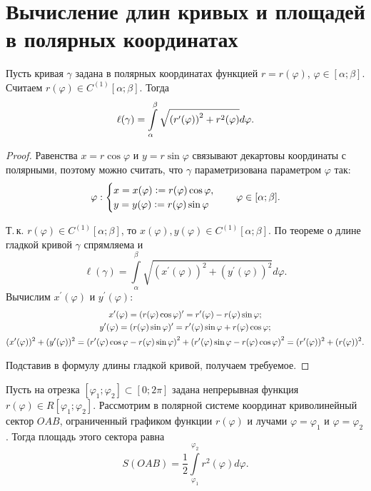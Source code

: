 \section{Вычисление длин кривых и площадей в полярных координатах}

\begin{theorem}
    Пусть кривая $\gamma$ задана в полярных координатах функцией $r = r(\varphi)$, $\varphi \in [\alpha; \beta]$. Считаем $r(\varphi) \in C^{(1)}[\alpha; \beta]$. Тогда
    \[
        \ell(\gamma) = \int\limits_\alpha^\beta\sqrt{\left(r^\prime(\varphi)\right)^2 + r^2(\varphi)}d\varphi.
    \]
\end{theorem}

\begin{proof}
    Равенства $x = r\cos\varphi$ и $y = r\sin\varphi$ связывают декартовы координаты с полярными, поэтому можно считать, что $\gamma$ параметризована параметром $\varphi$ так:
    \[
        \varphi:
        \begin{cases}
            x = x(\varphi) \vcentcolon = r(\varphi)\cos\varphi,\\
            y = y(\varphi) \vcentcolon = r(\varphi)\sin\varphi
        \end{cases}\quad \varphi \in [\alpha; \beta].
    \]

    Т.\,к. $r(\varphi) \in C^{(1)}[\alpha; \beta]$, то $x(\varphi), y(\varphi) \in C^{(1)}[\alpha; \beta]$. По теореме о длине гладкой кривой $\gamma$ спрямляема и
    \[
        \ell(\gamma) = \int\limits_\alpha^\beta\sqrt{(x^\prime(\varphi))^2 + (y^\prime(\varphi))^2}d\varphi.
    \]
    Вычислим $x^\prime(\varphi)$ и $y^\prime(\varphi)$:
    \begin{gather*}
        x^\prime(\varphi) = (r(\varphi)\cos\varphi)^\prime = r^\prime(\varphi) - r(\varphi)\sin\varphi;\\
        y^\prime(\varphi) = (r(\varphi)\sin\varphi)^\prime = r^\prime(\varphi)\sin\varphi + r(\varphi)\cos\varphi;\\
        (x^\prime(\varphi))^2 + (y^\prime(\varphi))^2 = \left(r^\prime(\varphi)\cos\varphi - r(\varphi)\sin\varphi\right)^2 + \left(r^\prime(\varphi)\sin\varphi - r(\varphi)\cos\varphi\right)^2 = (r^\prime(\varphi))^2 + (r(\varphi))^2.
    \end{gather*}

    Подставив в формулу длины гладкой кривой, получаем требуемое.
\end{proof}

\begin{theorem}
    Пусть на отрезка $[\varphi_1; \varphi_2] \subset [0; 2\pi]$ задана непрерывная функция $r(\varphi) \in R[\varphi_1; \varphi_2]$. Рассмотрим в полярной системе координат криволинейный сектор $OAB$, ограниченный графиком функции $r(\varphi)$ и лучами $\varphi = \varphi_1$ и $\varphi = \varphi_2$. Тогда площадь этого сектора равна
    \[
        S(OAB) = \frac{1}{2}\int\limits_{\varphi_1}^{\varphi_2}r^2(\varphi)d\varphi.
    \]
\end{theorem}

